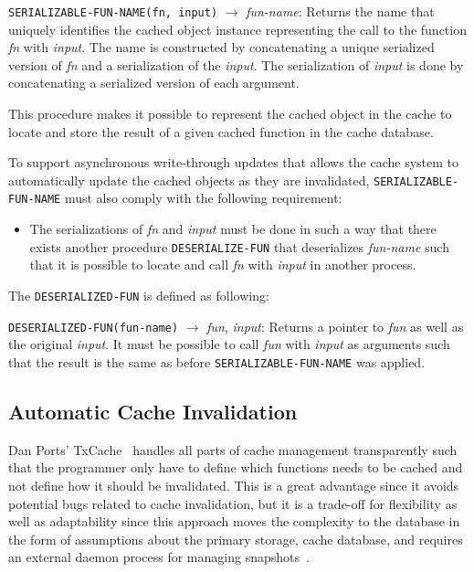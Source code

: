 \verb$SERIALIZABLE-FUN-NAME(fn, input)$ $\rightarrow$ \emph{fun-name}: Returns the name that uniquely identifies the cached object instance representing the call to the function \emph{fn} with \emph{input}. The name is constructed by concatenating a unique serialized version of \emph{fn} and a serialization of the \emph{input}. The serialization of \emph{input} is done by concatenating a serialized version of each argument.

This procedure makes it possible to represent the cached object in the cache to locate and store the result of a given cached function in the cache database.

To support asynchronous write-through updates that allows the cache system to automatically update the cached objects as they are invalidated,
\verb$SERIALIZABLE-FUN-NAME$ must also comply with the following requirement:

\begin{itemize}
  \item The serializations of \emph{fn} and \emph{input} must be done in such a way that there exists another procedure \verb$DESERIALIZE-FUN$ that deserializes \emph{fun-name} such that it is possible to locate and call \emph{fn} with \emph{input} in another process.
\end{itemize}

The \verb$DESERIALIZED-FUN$ is defined as following:

\verb$DESERIALIZED-FUN(fun-name)$ $\rightarrow$ \emph{fun}, \emph{input}: Returns a pointer to \emph{fun} as well as the original \emph{input}. It must be possible to call \emph{fun} with \emph{input} as arguments such that the result is the same as before \verb$SERIALIZABLE-FUN-NAME$ was applied.


\subsection{Automatic Cache Invalidation}
\label{subsec:automatic_cache_invalidation}

Dan Ports' TxCache~\cite{paper:liskov} handles all parts of cache management transparently such that the programmer only have to define which functions needs to be cached and not define how it should be invalidated. This is a great advantage since it avoids potential bugs related to cache invalidation, but it is a trade-off for flexibility as well as adaptability since this approach moves the complexity to the database in the form of assumptions about the primary storage, cache database, and requires an external daemon process for managing snapshots~\cite{paper:liskov}.

